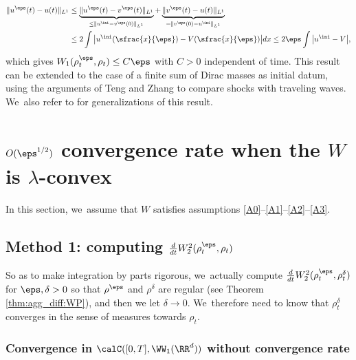 \begin{align*}
\|u^\eps(t) - u(t)\|_{L^1} &\leq \underbrace{\|u^\eps(t) - v^\eps(t)\|_{L^1}}_{\leq \|u^{\ini} - v^\eps(0)\|_{L^1}} + \underbrace{\|v^\eps(t) - u(t)\|_{L^1}}_{=\|v^\eps(0) - u^{\ini}\|_{L^1}}\\
&\leq 2 \int \big| u^{\ini}(\sfrac{x}{\eps}) - V(\sfrac{x}{\eps}) \big| dx
\leq 2 \eps \int \big| u^{\ini} - V \big|,
\end{align*}
which gives $W_1(\rho^\eps_t, \rho_t) \leq C\eps$ with $C>0$ independent of time. This result can be extended to the case of a finite sum of Dirac masses as initial datum, using the arguments of Teng and Zhang \cite{tengzhang97} to compare shocks with traveling waves. We~also refer to \cite{tang2001, tangteng97, teng98} for generalizations of this result.

\section{\texorpdfstring{$O(\eps^{1/2})$ convergence rate when the $W$ is $\lambda$-convex}{titlesection}}\label{section:lambdaConvex}

In this section, we~assume that $W$ satisfies assumptions \eqref{A0}--\eqref{A1}--\eqref{A2}--\eqref{A3}.

\subsection{Method 1: computing $\frac{d}{dt} W_2^2(\rho_t^\eps, \rho_t)$}\label{section:lambdaConvex:1}

So as to make integration by parts rigorous, we~actually compute $\frac{d}{dt} W_2^2(\rho_t^\eps, \rho_t^\delta)$ for $\eps,\delta >0$ so that $\rho^\eps$ and $\rho^\delta$ are regular (see Theorem \ref{thm:agg_diff:WP}), and then we let $\delta \to 0$. We~therefore need to know that $\rho_t^\delta$ converges in the sense of measures towards $\rho_t$.

\subsubsection{Convergence in $\calC([0,T], \WW_1(\RR^d))$ without convergence rate}

